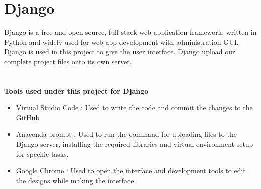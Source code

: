 \section{Django}
\noindent Django is a free and open source, full-stack web application framework, written in Python and widely used for web app development with administration GUI. Django is used in this project to give the user interface. Django upload our complete project files onto its own server.\citeauthor{four}\\\\ \\
\noindent
\textbf{Tools used under this project for Django}
\begin{itemize}
    \item Virtual Studio Code : Used to write the code and commit the changes to the GitHub
    \item Anaconda prompt : Used to run the command for uploading files to the Django server, installing the required libraries and virtual environment setup for specific tasks.
    \item Google Chrome : Used to open the interface and development tools to edit the designs while making the interface.
\end{itemize}
\\\\
